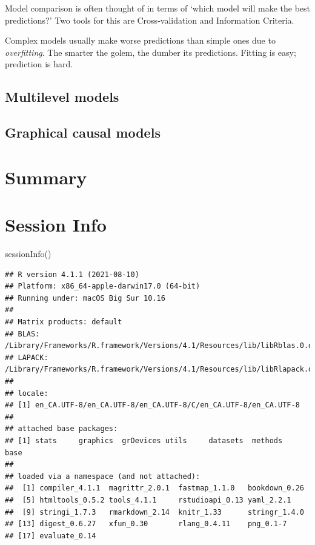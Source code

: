 \documentclass[
]{book}
\newenvironment{Shaded}{\begin{snugshade}}{\end{snugshade}}
\newcommand{\FunctionTok}[1]{\textcolor[rgb]{0.00,0.00,0.00}{#1}}
\newcommand{\NormalTok}[1]{#1}
\theoremstyle{definition}
\theoremstyle{definition}
\theoremstyle{definition}
\theoremstyle{definition}
\theoremstyle{remark}
\begin{document}
Model comparison is often thought of in terms of `which model will make the best predictions?' Two tools for this are Cross-validation and Information Criteria.

Complex models usually make worse predictions than simple ones due to \emph{overfitting}. The smarter the golem, the dumber its predictions. Fitting is easy; prediction is hard.

\hypertarget{multilevel-models}{%
\subsection{Multilevel models}\label{multilevel-models}}

\hypertarget{graphical-causal-models}{%
\subsection{Graphical causal models}\label{graphical-causal-models}}

\hypertarget{summary}{%
\section{Summary}\label{summary}}

\hypertarget{session-info}{%
\section*{Session Info}\label{session-info}}

\begin{Shaded}
\begin{Highlighting}[]
\FunctionTok{sessionInfo}\NormalTok{()}
\end{Highlighting}
\end{Shaded}

\begin{verbatim}
## R version 4.1.1 (2021-08-10)
## Platform: x86_64-apple-darwin17.0 (64-bit)
## Running under: macOS Big Sur 10.16
## 
## Matrix products: default
## BLAS:   /Library/Frameworks/R.framework/Versions/4.1/Resources/lib/libRblas.0.dylib
## LAPACK: /Library/Frameworks/R.framework/Versions/4.1/Resources/lib/libRlapack.dylib
## 
## locale:
## [1] en_CA.UTF-8/en_CA.UTF-8/en_CA.UTF-8/C/en_CA.UTF-8/en_CA.UTF-8
## 
## attached base packages:
## [1] stats     graphics  grDevices utils     datasets  methods   base     
## 
## loaded via a namespace (and not attached):
##  [1] compiler_4.1.1  magrittr_2.0.1  fastmap_1.1.0   bookdown_0.26  
##  [5] htmltools_0.5.2 tools_4.1.1     rstudioapi_0.13 yaml_2.2.1     
##  [9] stringi_1.7.3   rmarkdown_2.14  knitr_1.33      stringr_1.4.0  
## [13] digest_0.6.27   xfun_0.30       rlang_0.4.11    png_0.1-7      
## [17] evaluate_0.14
\end{verbatim}
\end{document}
